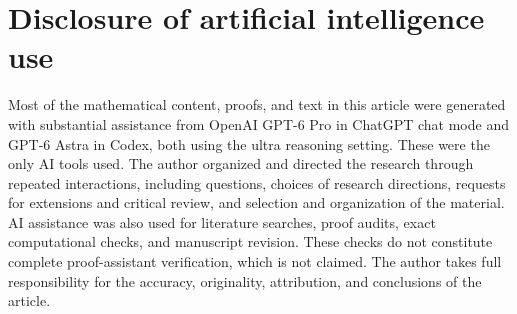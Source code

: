 \documentclass[reqno]{amsart}
\theoremstyle{definition}
\theoremstyle{remark}
\begin{document}
\section*{Disclosure of artificial intelligence use}
Most of the mathematical content, proofs, and text in this article
were generated with substantial assistance from
OpenAI GPT-6 Pro in ChatGPT chat mode and GPT-6 Astra in Codex, both
using the ultra reasoning setting. These were the only AI tools used.
The author organized and directed the research through repeated
interactions, including questions, choices of research directions,
requests for extensions and critical review, and selection and
organization of the material. AI assistance was also used for
literature searches, proof audits, exact computational checks, and
manuscript revision. These checks do not constitute complete
proof-assistant verification, which is not claimed.
The author takes full responsibility for the accuracy, originality,
attribution, and conclusions of the article.
\end{document}
